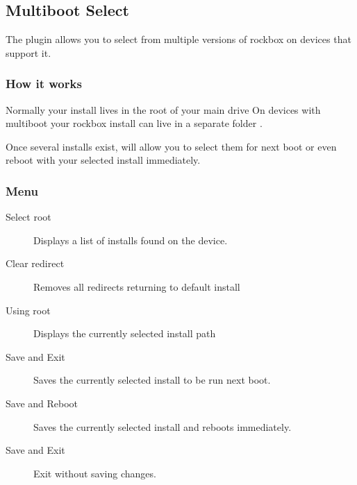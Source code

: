 \subsection{Multiboot Select}
The  plugin allows you to select from multiple
versions of rockbox on devices that support it.

\subsubsection{How it works}
Normally your  install lives in the root of your main drive
On devices with multiboot your rockbox install can live in a separate folder
.

Once several installs exist,  will allow you to
select them for next boot or even reboot with your selected install immediately.

\subsubsection{Menu}
\begin{description}
\item[Select root] Displays a list of installs found on the device.
\item[Clear redirect] Removes all redirects returning to default install
\item[Using root] Displays the currently selected install path
\item[Save and Exit] Saves the currently selected install to be run next boot.
\item[Save and Reboot] Saves the currently selected install and reboots immediately.
\item[Save and Exit] Exit without saving changes.
\end{description}
